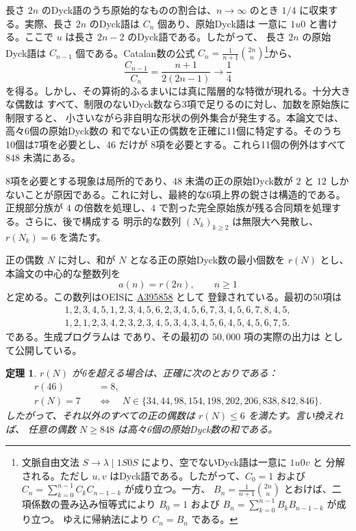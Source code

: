 \documentclass[12pt]{ltjsarticle}
\theoremstyle{plain}
\newtheorem{theorem}{定理}
\theoremstyle{definition}
\theoremstyle{plain}
\newcommand{\seqnum}[1]{\href{https://oeis.org/#1}{\textrm{\underline{#1}}}}
\begin{document}
長さ $2n$ のDyck語のうち原始的なものの割合は、$n\to\infty$ のとき
$1/4$ に収束する。実際、長さ $2n$ のDyck語は $C_n$ 個あり、原始Dyck語は
一意に $1u0$ と書ける。ここで $u$ は長さ $2n-2$ のDyck語である。したがって、
長さ $2n$ の原始Dyck語は $C_{n-1}$ 個である。Catalan数の公式
$C_n=\frac1{n+1}\binom{2n}{n}$\footnote{文脈自由文法
$S\to\lambda\mid 1S0S$ により、空でないDyck語は一意に $1u0v$ と
分解される。ただし $u,v$ はDyck語である。したがって、$C_0=1$ および
$C_n=\sum_{k=0}^{n-1}C_kC_{n-1-k}$ が成り立つ。一方、
$B_n=\frac{1}{n+1}\binom{2n}{n}$ とおけば、二項係数の畳み込み恒等式により
$B_0=1$ および $B_n=\sum_{k=0}^{n-1}B_kB_{n-1-k}$ が成り立つ。
ゆえに帰納法により $C_n=B_n$ である。}から、
\[
 \frac{C_{n-1}}{C_n}=\frac{n+1}{2(2n-1)}\longrightarrow\frac14
\]
を得る。しかし、その算術的ふるまいには真に階層的な特徴が現れる。十分大きな偶数は
すべて、制限のないDyck数なら3項で足りるのに対し、加数を原始族に制限すると、
小さいながら非自明な形状の例外集合が発生する。本論文では、高々6個の原始Dyck数の
和でない正の偶数を正確に11個に特定する。そのうち10個は7項を必要とし、$46$ だけが
8項を必要とする。これら11個の例外はすべて $848$ 未満にある。

8項を必要とする現象は局所的であり、$48$ 未満の正の原始Dyck数が $2$ と $12$ しか
ないことが原因である。これに対し、最終的な6項上界の鋭さは構造的である。正規部分族が
$4$ の倍数を処理し、$4$ で割った完全原始族が残る合同類を処理する。さらに、後で構成する
明示的な数列 $(N_k)_{k\geq2}$ は無限大へ発散し、$r(N_k)=6$ を満たす。

正の偶数 $N$ に対し、和が $N$ となる正の原始Dyck数の最小個数を $r(N)$ とし、
本論文の中心的な整数列を
\[
        a(n)=r(2n),\qquad n\geq1
\]
と定める。この数列はOEISに \seqnum{A395858} \cite{OEIS-A395858} として
登録されている。最初の50項は
\[
\begin{gathered}
1,2,3,4,5,1,2,3,4,5,6,2,3,4,5,6,7,3,4,5,6,7,8,4,5,\\
1,2,1,2,3,4,2,3,2,3,4,5,3,4,3,4,5,6,4,5,4,5,6,7,5.
\end{gathered}
\]
である。生成プログラムは
\href{https://github.com/growupkuriyama-hub/lean_cfg_project/blob/3525cfb/LeanCfgProject/PrimDyck/A395858.py}{}
であり、その最初の $50{,}000$ 項の実際の出力は
\href{https://github.com/growupkuriyama-hub/lean_cfg_project/blob/3525cfb/LeanCfgProject/PrimDyck/b395858.txt}{}
として公開している。

\begin{theorem}\label{thm:classification}
$r(N)$ が6を超える場合は、正確に次のとおりである：
\[
\begin{aligned}
 r(46)&=8,\\[4pt]
 r(N)=7\quad&\Longleftrightarrow\quad
 N\in\{34,44,98,154,198,202,206,838,842,846\}.
\end{aligned}
\]
したがって、それ以外のすべての正の偶数は $r(N)\leq6$ を満たす。言い換えれば、
任意の偶数 $N\geq848$ は高々6個の原始Dyck数の和である。
\end{theorem}
\end{document}
